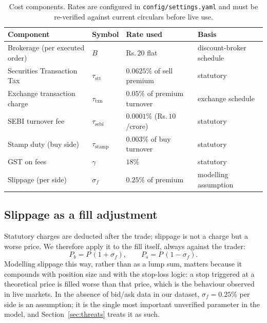 \documentclass[11pt,a4paper]{article}
\newcommand{\rs}{Rs.\,}                 %
\newcommand{\code}[1]{\texttt{#1}}
\begin{document}
\begin{table}[H]
\centering\small
\begin{tabular}{@{}llll@{}}
\toprule
\textbf{Component} & \textbf{Symbol} & \textbf{Rate used} & \textbf{Basis}\\
\midrule
Brokerage (per executed order) & $B$                & \rs$20$ flat & discount-broker schedule \cite{zerodhacharges}\\
Securities Transaction Tax     & $\tau_{\text{stt}}$& $0.0625\%$ of sell premium & statutory \cite{zerodhastt}\\
Exchange transaction charge    & $\tau_{\text{txn}}$& $0.05\%$ of premium turnover & exchange schedule \cite{zerodhacharges}\\
SEBI turnover fee              & $\tau_{\text{sebi}}$& $0.0001\%$ (\rs$10$/crore) & statutory \cite{zerodhacharges}\\
Stamp duty (buy side)          & $\tau_{\text{stamp}}$& $0.003\%$ of buy turnover & statutory \cite{zerodhacharges}\\
GST on fees                    & $\gamma$           & $18\%$ & statutory \cite{zerodhacharges}\\
Slippage (per side)            & $\sigma_{\!f}$     & $0.25\%$ of premium & modelling assumption\\
\bottomrule
\end{tabular}
\caption{Cost components. Rates are configured in \code{config/settings.yaml} and must be
re-verified against current circulars before live use.}
\label{tab:rates}
\end{table}

\subsection{Slippage as a fill adjustment}

Statutory charges are deducted after the trade; slippage is not a charge but a worse
price. We therefore apply it to the fill itself, always against the trader:
\begin{equation}
P_b = P\,(1+\sigma_{\!f}), \qquad P_s = P\,(1-\sigma_{\!f}).
\end{equation}
Modelling slippage this way, rather than as a lump sum, matters because it compounds
with position size and with the stop-loss logic: a stop triggered at a theoretical price
is filled worse than that price, which is the behaviour observed in live markets. In the
absence of bid/ask data in our dataset, $\sigma_{\!f}=0.25\%$ per side is an assumption;
it is the single most important unverified parameter in the model, and
Section~\ref{sec:threats} treats it as such.
\end{document}
